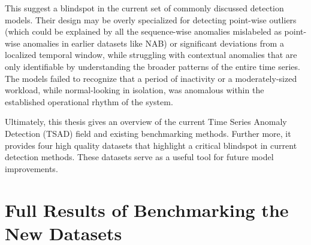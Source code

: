 \documentclass[12pt,oneside]{article}
\begin{document}
This suggest a blindspot in the current set of commonly discussed detection models. Their design may be overly specialized for detecting point-wise outliers (which could be explained by all the sequence-wise anomalies mislabeled as point-wise anomalies in earlier datasets like NAB) or significant deviations from a localized temporal window, while struggling with contextual anomalies that are only identifiable by understanding the broader patterns of the entire time series. The models failed to recognize that a period of inactivity or a moderately-sized workload, while normal-looking in isolation, was anomalous within the established operational rhythm of the system. \par

Ultimately, this thesis gives an overview of the current Time Series Anomaly Detection (TSAD) field and existing benchmarking methods. Further more, it provides four high quality datasets that highlight a critical blindspot in current detection methods. These datasets serve as a useful tool for future model improvements. 












\clearpage
\lhead{}
\printbibliography
{}


\clearpage
\appendix
\section{Full Results of Benchmarking the New Datasets}
\end{document}
